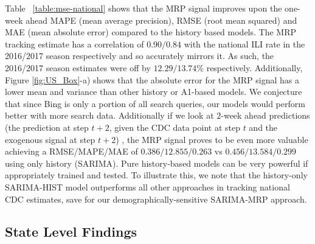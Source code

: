 \documentclass[fleqn,10pt]{wlscirep}
\begin{document}
Table ~\ref{table:mse-national} shows that the MRP signal improves upon the one-week ahead MAPE (mean average precision), RMSE (root mean squared)  and MAE (mean absolute error) compared to the history based models. The MRP tracking estimate has a correlation of $0.90/0.84$ with the national ILI rate in the 2016/2017 season respectively and so accurately mirrors it. As such, the 2016/2017 season estimates were off by $12.29/13.74\%$ respectively. Additionally, Figure \ref{fig:US_Box}-a) shows that the absolute error for the MRP signal has a lower mean and variance than other history or A1-based models. We conjecture that since Bing is only a portion of all search queries, our models would perform better with more search data. Additionally if we look at $2$-week ahead predictions (the prediction at step $t+2$, given the CDC data point at step $t$ and the exogenous signal at step $t+2$) , the MRP signal proves to be even more valuable achieving a RMSE/MAPE/MAE of $0.386/12.855/0.263$ vs $0.456/13.584/0.299$ using only history (SARIMA). Pure history-based models can be very powerful if appropriately trained and tested. To illustrate this, we note that the history-only SARIMA-HIST model outperforms all other approaches in tracking national CDC estimates, save for our demographically-sensitive SARIMA-MRP approach.


\subsection*{State Level Findings}

\end{document}
